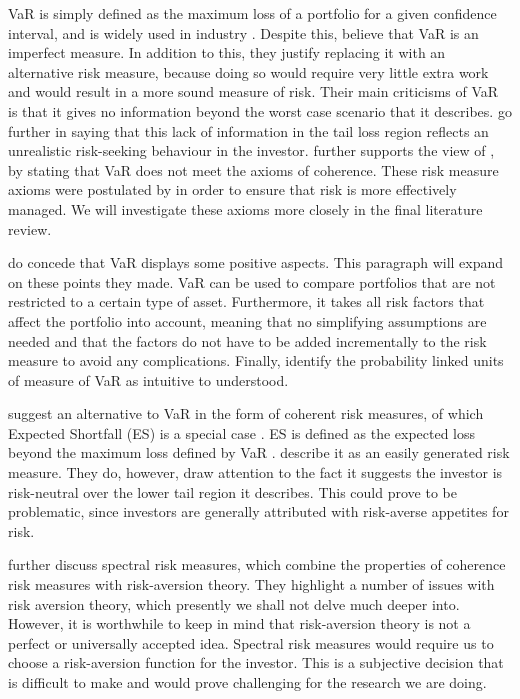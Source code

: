 \documentclass[12pt,a4paper]{article}
\begin{document}
VaR is simply defined as the maximum loss of a portfolio for a given confidence interval, and is widely used in industry \citep{consiglirisk}.  Despite this, \cite{dowd2006after} believe that VaR is an imperfect measure. In addition to this, they justify replacing it with an alternative risk measure, because doing so would require very little extra work and would result in a more sound measure of risk. Their main criticisms of VaR is that it gives no information beyond the worst case scenario that it describes. \cite{dowd2006after} go further in saying that this lack of information in the tail loss region reflects an unrealistic risk-seeking behaviour in the investor. \cite{ACERBI20021505} further supports the view of \cite{dowd2006after}, by stating that VaR does not meet the axioms of coherence. These risk measure axioms were postulated by \cite{artzner1999coherent} in order to ensure that risk is more effectively managed. We will investigate these axioms more closely in the final literature review.

\cite{dowd2006after} do concede that VaR displays some positive aspects. This paragraph will expand on these points they made. VaR can be used to compare portfolios that are not restricted to a certain type of asset. Furthermore, it takes all risk factors that affect the portfolio into account, meaning that no simplifying assumptions are needed and that the factors do not have to be added incrementally to the risk measure to avoid any complications. Finally, \cite{dowd2006after} identify the probability linked units of measure of VaR as intuitive to understood.

\cite{dowd2006after} suggest an alternative to VaR in the form of coherent risk measures, of which Expected Shortfall (ES) is a special case \citep{ACERBI20021505}. ES is defined as the expected loss beyond the maximum loss defined by VaR \citep{consiglirisk}. \cite{dowd2006after} describe it as an easily generated risk measure. They do, however, draw attention to the fact it suggests the investor is risk-neutral over the lower tail region it describes. This could prove to be problematic, since investors are generally attributed with risk-averse appetites for risk.

\cite{dowd2006after} further discuss spectral risk measures, which combine the properties of coherence risk measures with risk-aversion theory. They highlight a number of issues with risk aversion theory, which presently we shall not delve much deeper into. However, it is worthwhile to keep in mind that risk-aversion theory is not a perfect or universally accepted idea. Spectral risk measures would require us to choose a risk-aversion function for the investor. This is a subjective decision that is difficult to make and would prove challenging for the research we are doing.
\end{document}

